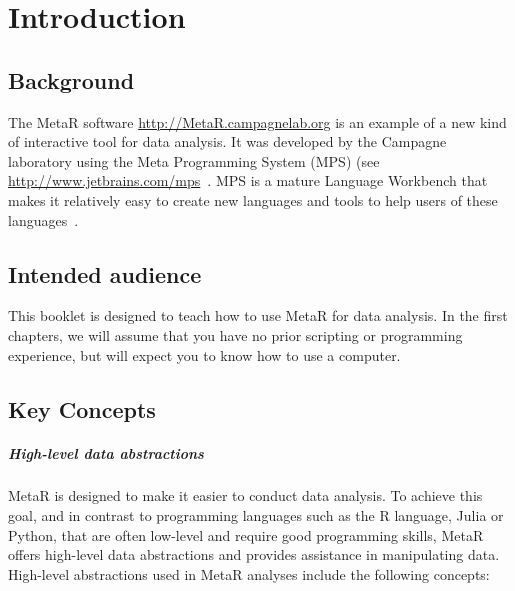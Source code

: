 


\chapter{Introduction}\label{chap:Introduction}
\section{Background}
The MetaR software \url{http://MetaR.campagnelab.org} is an example of a new kind of interactive tool for data analysis. It was developed by the Campagne laboratory using the Meta Programming System (MPS) (see \url{http://www.jetbrains.com/mps}~\cite{Dmitriev:2004}. MPS is a mature Language Workbench that makes it relatively easy to create new languages and tools to help users of these languages~\cite{campagne2014mps}. 

\section{Intended audience}
This booklet is designed to teach how to use MetaR for data analysis. In the first chapters, we will assume that you have no prior scripting or programming experience, but will expect you to know how to use a computer.


\section{Key Concepts}
\paragraph{High-level data abstractions}
MetaR is designed to make it easier to conduct data analysis. To achieve this goal, and in contrast to programming languages such as the R language, Julia or Python, that are often low-level and require good programming skills, MetaR offers high-level data abstractions and provides assistance in manipulating data. High-level abstractions used in MetaR analyses include the following concepts:

